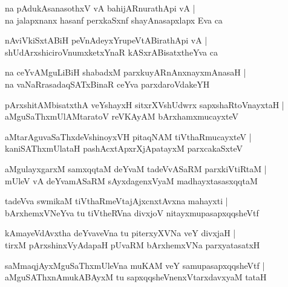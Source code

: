 \documentclass[twoside,12pt,openright]{book}
\newcounter{shloka}[chapter]
\begin{document}
\begin{shloka}
na pAdukAsanasothxV vA bahijARnurathApi vA |\\
na jalapxnanx hasanf perxkaSxnf shayAnasapxlapx Eva ca 
\end{shloka}

\begin{shloka}
nAviVkiSxtABiH peVnAdeyxYrupeVtABirathApi vA |\\
shUdArxshiciroVnumxketxYnaR kASxrABisatxtheYva ca 
\end{shloka}

\begin{shloka}
na ceYvAMguLiBiH shabadxM parxkuyARnAnxnayxmAnasaH |\\
na vaNaRrasadaqSATxBinaR ceYva parxdaroVdakeYH
\end{shloka}

\begin{shloka}
pArxshitAMbisatxthA veYshayxH sitxrXVshUdwrx sapxshaRtoVnayxtaH |\\
aMguSaThxmUlAMtaratoV reVKAyAM bArxhamxmucayxteV 
\end{shloka}

\begin{shloka}
aMtarAguvaSaThxdeVshinoyxVH pitaqNAM tiVthaRmucayxteV |\\
kaniSAThxmUlataH pashAcxtApxrXjApatayxM parxcakaSxteV
\end{shloka}

\begin{shloka}
aMgulayxgarxM samxqqtaM deYvaM tadeVvASaRM parxkiVtiRtaM |\\
mUleV vA deYvamASaRM sAyxdagenxVyaM madhayxtasasxqqtaM 
\end{shloka}

\begin{shloka}
tadeVva swmikaM tiVthaRmeVtajAjxcnxtAvxna mahayxti |\\
bArxhemxVNeYva tu tiVtheRVna divxjoV nitayxmupasapxqqsheVtf 
\end{shloka}

\begin{shloka}
kAmayeVdAvxtha deYvaveVna tu piterxyXVNa veY divxjaH |\\
tirxM pArxshinxVyAdapaH pUvaRM bArxhemxVNa parxyatasatxH 
\end{shloka}

\begin{shloka}
saMmaqjAyxMguSaThxmUleVna muKAM veY samupasapxqqsheVtf |\\
aMguSAThxnAmukABAyxM tu sapxqqsheVnenxVtarxdavxyaM tataH 
\end{shloka}
\end{document}
